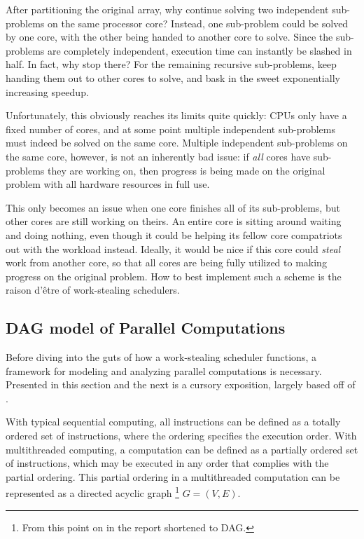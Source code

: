 \documentclass[bsc,frontabs,singlespacing,parskip,deptreport,normalheadings]{infthesis}
\begin{document}
After partitioning the original array, why continue solving two independent
sub-problems on the same processor core? Instead, one sub-problem could be
solved by one core, with the other being handed to another core to solve. Since
the sub-problems are completely independent, execution time can instantly be
slashed in half. In fact, why stop there? For the remaining recursive
sub-problems, keep handing them out to other cores to solve, and bask in the
sweet exponentially increasing speedup.

Unfortunately, this obviously reaches its limits quite quickly: CPUs only have a
fixed number of cores, and at some point multiple independent sub-problems must
indeed be solved on the same core. Multiple independent sub-problems on the
same core, however, is not an inherently bad issue: if \textit{all} cores have
sub-problems they are working on, then progress is being made on the original
problem with all hardware resources in full use.

This only becomes an issue when one core finishes all of its sub-problems, but
other cores are still working on theirs. An entire core is sitting around
waiting and doing nothing, even though it could be helping its fellow core
compatriots out with the workload instead. Ideally, it would be nice if this
core could \textit{steal} work from another core, so that all cores are being
fully utilized to making progress on the original problem. How to best implement
such a scheme is the raison d'être of work-stealing schedulers.

\subsection{DAG model of Parallel Computations}

Before diving into the guts of how a work-stealing scheduler functions, a
framework for modeling and analyzing parallel computations is necessary.
Presented in this section and the next is a cursory exposition, largely based
off of \cite{cormen_introduction_2009, herlihy_art_2012,
blumofe_executing_1995}.

With typical sequential computing, all instructions can be defined as a
totally ordered set of instructions, where the ordering specifies the
execution order. With multithreaded computing, a computation can be defined
as a partially ordered set of instructions, which may be executed in any
order that complies with the partial ordering. This partial ordering in a
multithreaded computation can be represented as a directed acyclic graph
\footnote{From this point on in the report shortened to DAG.} \(G = (V, E)\).
\end{document}
